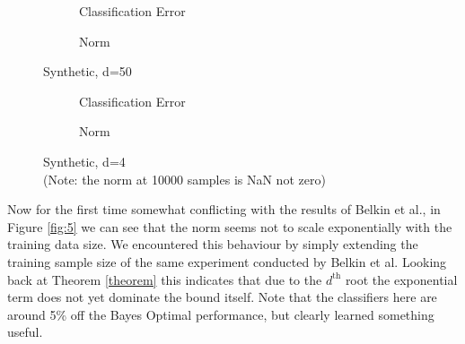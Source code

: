 
\begin{figure}[p]

\begin{subfigure}{0.49\textwidth}
\caption{Classification Error} \label{fig:5a}
\end{subfigure}
\hspace*{\fill} %
\begin{subfigure}{0.49\textwidth}
\caption{Norm} \label{fig:5b}
\end{subfigure}
\caption{Synthetic, d=50} \label{fig:5}

\begin{subfigure}{0.49\textwidth}
\caption{Classification Error} \label{fig:6a}
\end{subfigure}
\hspace*{\fill} %
\begin{subfigure}{0.49\textwidth}
\caption{Norm} \label{fig:6b}
\end{subfigure}
\caption{Synthetic, d=4 \\(Note: the norm at 10000 samples is NaN not zero)} \label{fig:6}

\end{figure}
Now for the first time somewhat conflicting with the results of Belkin et al., in Figure \ref{fig:5} we can see that the norm seems not to scale exponentially with the training data size. We encountered this behaviour by simply extending the training sample size of the same experiment conducted by Belkin et al. Looking back at Theorem \ref{theorem} this indicates that due to the $d^{\text{th}}$ root the exponential term does not yet dominate the bound itself. Note that the classifiers here are around 5\% off the Bayes Optimal performance, but clearly learned something useful.

